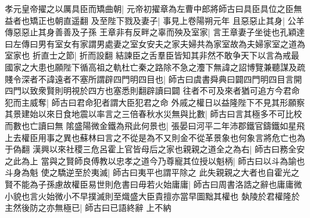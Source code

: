 孝元皇帝擢之以厲具臣而矯曲朝|{
	元帝初擢章為左曹中郎將師古曰具臣具位之臣無益者也矯正也朝直遥翻}
及至陛下戮及妻子|{
	事見上卷陽朔元年}
且惡惡止其身|{
	公羊傳惡惡止其身善善及子孫}
王章非有反畔之辜而殃及室家|{
	言王章妻子坐徙也孔穎達曰左傳曰男有室女有家謂男處妻之室女安夫之家夫婦共為家室故為夫婦家室之道為室家也}
折直士之節|{
	折而設翻}
結諫臣之舌羣臣皆知其非然不敢争天下以言為戒最國家之大患也願陛下循高祖之軌杜亡秦之路除不急之灋下無諱之詔博覽兼聽謀及疏賤令深者不諱遠者不塞所謂辟四門明四目也|{
	師古曰虞書舜典曰闢四門明四目言開四門以致衆賢則明視於四方也塞悉則翻辟讀曰闢}
往者不可及來者猶可追方今君命犯而主威奪|{
	師古曰君命犯者謂大臣犯君之命}
外戚之權日以益隆陛下不見其形願察其景建始以來日食地震以率言之三倍春秋水災無與比數|{
	師古曰言其極多不可比校而數也亡讀曰無}
隂盛陽微金鐵為飛此何景也|{
	張晏曰河平二年沛郡鐵官鑄鐵如星飛上去權臣用事之異也蘇林曰言之不從是為不又則金不從革景象也何象言將危亡也為于偽翻}
漢興以來社稷三危呂霍上官皆母后之家也親親之道全之為右|{
	師古曰務全安之此為上}
當與之賢師良傅教以忠孝之道今乃尊寵其位授以魁柄|{
	師古曰以斗為諭也斗身為魁}
使之驕逆至於夷滅|{
	師古曰夷平也謂平除之}
此失親親之大者也自霍光之賢不能為子孫慮故權臣易世則危書曰毋若火始庸庸|{
	師古曰周書洛誥之辭也庸庸微小貌也言火始微小不早撲滅則至熾盛大臣貴擅亦當早圖黜其權也}
埶陵於君權隆於主然後防之亦無極已|{
	師古曰已語終辭}
上不納

